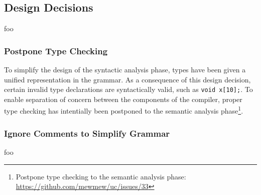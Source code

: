 \subsection{Design Decisions}

foo

\subsubsection{Postpone Type Checking}

To simplify the design of the syntactic analysis phase, types have been given a unified representation in the grammar. As a consequence of this design decision, certain invalid type declarations are syntactically valid, such as \texttt{void x[10];}. To enable separation of concern between the components of the compiler, proper type checking has intentially been postponed to the semantic analysis phase\footnote{Postpone type checking to the semantic analysis phase: \url{https://github.com/mewmew/uc/issues/33}}.

\subsubsection{Ignore Comments to Simplify Grammar}

%
%
%


foo

